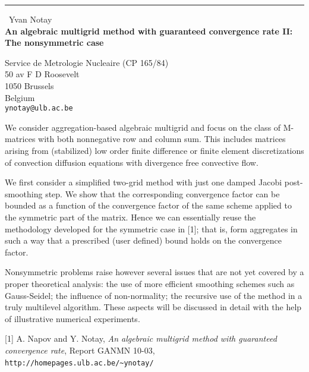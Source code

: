 \documentclass{report}
\begin{document}
\begin{center}
\rule{6in}{1pt} \
{\large Yvan Notay \\
{\bf An algebraic multigrid method with guaranteed convergence rate II: The nonsymmetric case}}

Service de Metrologie Nucleaire (CP 165/84) \\ 50 av F D Roosevelt \\ 1050 Brussels \\ Belgium
\\
{\tt ynotay@ulb.ac.be}\end{center}

We consider aggregation-based algebraic multigrid
and focus on the class of
M-matrices with both nonnegative row and column sum. This includes matrices
arising from (stabilized) low order finite difference or finite element
discretizations of convection diffusion equations with divergence free
convective flow.

We first consider a simplified two-grid method with just one damped Jacobi
post-smoothing step. We show that the corresponding convergence factor
can be bounded as a function of the convergence factor of the same scheme
applied to the symmetric part of the matrix.
Hence we can essentially reuse the methodology developed for the symmetric
case in
[1]; that is, form aggregates
in such a way that a prescribed (user defined) bound holds on
the convergence factor.

Nonsymmetric problems raise however several issues that are not yet
covered by a proper
theoretical analysis: the use of more efficient smoothing schemes such as Gauss-Seidel;
the influence of non-normality;
the recursive use of the method in a truly multilevel algorithm.
These aspects will be discussed in detail with the help of illustrative
numerical experiments.


[1] A. Napov and Y. Notay, {\em An algebraic multigrid method with
guaranteed convergence rate},
Report GANMN 10-03, \verb+http://homepages.ulb.ac.be/~ynotay/+\,
\end{document}
